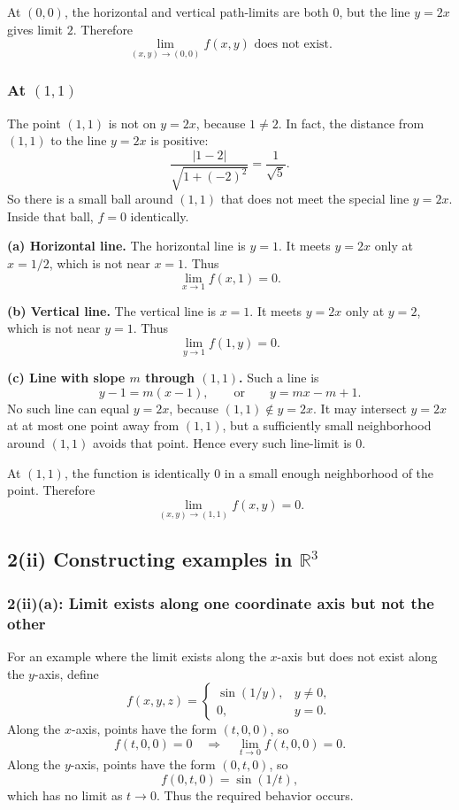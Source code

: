 \documentclass[11pt]{article}
\newcommand{\R}{\mathbb{R}}
\begin{document}
\begin{answerbox}
At \((0,0)\), the horizontal and vertical path-limits are both \(0\), but the line \(y=2x\) gives limit \(2\). Therefore
\[
\boxed{\lim_{(x,y)\to(0,0)} f(x,y)\text{ does not exist}.}
\]
\end{answerbox}

\subsubsection*{At \((1,1)\)}

The point \((1,1)\) is not on \(y=2x\), because \(1\neq2\). In fact, the distance from \((1,1)\) to the line \(y=2x\) is positive:
\[
\frac{|1-2|}{\sqrt{1+(-2)^2}}=\frac1{\sqrt5}.
\]
So there is a small ball around \((1,1)\) that does not meet the special line \(y=2x\). Inside that ball, \(f=0\) identically.

\textbf{(a) Horizontal line.} The horizontal line is \(y=1\). It meets \(y=2x\) only at \(x=1/2\), which is not near \(x=1\). Thus
\[
\lim_{x\to1} f(x,1)=0.
\]

\textbf{(b) Vertical line.} The vertical line is \(x=1\). It meets \(y=2x\) only at \(y=2\), which is not near \(y=1\). Thus
\[
\lim_{y\to1} f(1,y)=0.
\]

\textbf{(c) Line with slope \(m\) through \((1,1)\).} Such a line is
\[
y-1=m(x-1),\qquad\text{or}\qquad y=mx-m+1.
\]
No such line can equal \(y=2x\), because \((1,1)\notin y=2x\). It may intersect \(y=2x\) at at most one point away from \((1,1)\), but a sufficiently small neighborhood around \((1,1)\) avoids that point. Hence every such line-limit is \(0\).

\begin{answerbox}
At \((1,1)\), the function is identically \(0\) in a small enough neighborhood of the point. Therefore
\[
\boxed{\lim_{(x,y)\to(1,1)} f(x,y)=0.}
\]
\end{answerbox}

\subsection{2(ii) Constructing examples in \(\R^3\)}

\subsubsection*{2(ii)(a): Limit exists along one coordinate axis but not the other}

For an example where the limit exists along the \(x\)-axis but does not exist along the \(y\)-axis, define
\[
f(x,y,z)=
\begin{cases}
\sin(1/y),& y\neq0,\\
0,&y=0.
\end{cases}
\]
Along the \(x\)-axis, points have the form \((t,0,0)\), so
\[
f(t,0,0)=0\quad\Rightarrow\quad \lim_{t\to0}f(t,0,0)=0.
\]
Along the \(y\)-axis, points have the form \((0,t,0)\), so
\[
f(0,t,0)=\sin(1/t),
\]
which has no limit as \(t\to0\). Thus the required behavior occurs.
\end{document}
